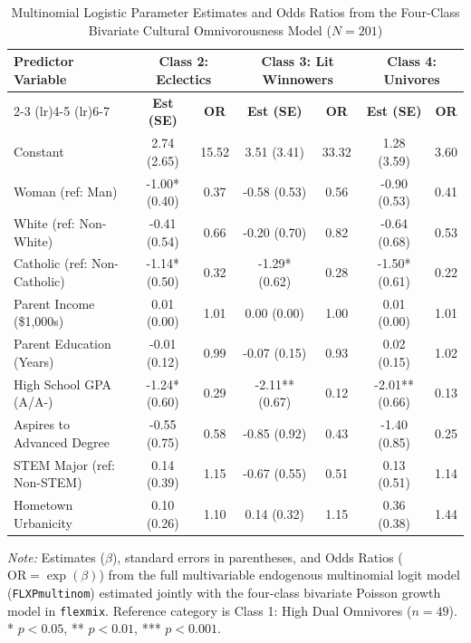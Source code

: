 \documentclass[12pt]{article}
\begin{document}
\begin{table}[htbp]
\centering
\small
\setlength{\tabcolsep}{4pt}
\caption{Multinomial Logistic Parameter Estimates and Odds Ratios from the Four-Class Bivariate Cultural Omnivorousness Model ($N = 201$)}
\label{tab:app_coefs_biv}
\begin{tabular*}{\linewidth}{@{\extracolsep{\fill}}lcccccc@{}}
\toprule
Predictor Variable & \multicolumn{2}{c}{\textbf{Class 2: Eclectics}} & \multicolumn{2}{c}{\textbf{Class 3: Lit Winnowers}} & \multicolumn{2}{c}{\textbf{Class 4: Univores}} \\
\cmidrule(lr){2-3} \cmidrule(lr){4-5} \cmidrule(lr){6-7}
& \textbf{Est (SE)} & \textbf{OR} & \textbf{Est (SE)} & \textbf{OR} & \textbf{Est (SE)} & \textbf{OR} \\
\midrule
Constant & 2.74 (2.65) & 15.52 & 3.51 (3.41) & 33.32 & 1.28 (3.59) & 3.60 \\
Woman (ref: Man) & -1.00* (0.40) & 0.37 & -0.58 (0.53) & 0.56 & -0.90 (0.53) & 0.41 \\
White (ref: Non-White) & -0.41 (0.54) & 0.66 & -0.20 (0.70) & 0.82 & -0.64 (0.68) & 0.53 \\
Catholic (ref: Non-Catholic) & -1.14* (0.50) & 0.32 & -1.29* (0.62) & 0.28 & -1.50* (0.61) & 0.22 \\
Parent Income (\$1,000s) & 0.01 (0.00) & 1.01 & 0.00 (0.00) & 1.00 & 0.01 (0.00) & 1.01 \\
Parent Education (Years) & -0.01 (0.12) & 0.99 & -0.07 (0.15) & 0.93 & 0.02 (0.15) & 1.02 \\
High School GPA (A/A-) & -1.24* (0.60) & 0.29 & -2.11** (0.67) & 0.12 & -2.01** (0.66) & 0.13 \\
Aspires to Advanced Degree & -0.55 (0.75) & 0.58 & -0.85 (0.92) & 0.43 & -1.40 (0.85) & 0.25 \\
STEM Major (ref: Non-STEM) & 0.14 (0.39) & 1.15 & -0.67 (0.55) & 0.51 & 0.13 (0.51) & 1.14 \\
Hometown Urbanicity & 0.10 (0.26) & 1.10 & 0.14 (0.32) & 1.15 & 0.36 (0.38) & 1.44 \\
\bottomrule
\end{tabular*}
\begin{minipage}{\linewidth}
\vspace{4pt}
\footnotesize
\textit{Note:} Estimates ($\beta$), standard errors in parentheses, and Odds Ratios ($\text{OR} = \exp(\beta)$) from the full multivariable endogenous multinomial logit model (\texttt{FLXPmultinom}) estimated jointly with the four-class bivariate Poisson growth model in \texttt{flexmix}. Reference category is Class 1: High Dual Omnivores ($n = 49$). * $p < 0.05$, ** $p < 0.01$, *** $p < 0.001$.
\end{minipage}
\end{table}



\end{document}
